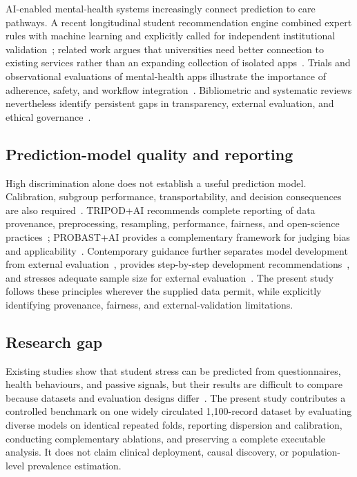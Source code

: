 \documentclass[review]{elsarticle}
\begin{document}
AI-enabled mental-health systems increasingly connect prediction to care pathways. A recent longitudinal student recommendation engine combined expert rules with machine learning and explicitly called for independent institutional validation~\cite{velmovitsky2025}; related work argues that universities need better connection to existing services rather than an expanding collection of isolated apps~\cite{pryss2025}. Trials and observational evaluations of mental-health apps illustrate the importance of adherence, safety, and workflow integration~\cite{chen2023app,carreiro2024}. Bibliometric and systematic reviews nevertheless identify persistent gaps in transparency, external evaluation, and ethical governance~\cite{chen2024bibliometric,alhuwaydi2024,cruz2025}.

\subsection{Prediction-model quality and reporting}
High discrimination alone does not establish a useful prediction model. Calibration, subgroup performance, transportability, and decision consequences are also required~\cite{steyerberg2010,niculescu2005}. TRIPOD+AI recommends complete reporting of data provenance, preprocessing, resampling, performance, fairness, and open-science practices~\cite{collins2024}; PROBAST+AI provides a complementary framework for judging bias and applicability~\cite{moons2025}. Contemporary guidance further separates model development from external evaluation~\cite{van2024evaluation}, provides step-by-step development recommendations~\cite{riley2024guide}, and stresses adequate sample size for external evaluation~\cite{riley2024samplesize}. The present study follows these principles wherever the supplied data permit, while explicitly identifying provenance, fairness, and external-validation limitations.

\subsection{Research gap}
Existing studies show that student stress can be predicted from questionnaires, health behaviours, and passive signals, but their results are difficult to compare because datasets and evaluation designs differ~\cite{daza2023,defilippis2024,shvetcov2024}. The present study contributes a controlled benchmark on one widely circulated 1,100-record dataset by evaluating diverse models on identical repeated folds, reporting dispersion and calibration, conducting complementary ablations, and preserving a complete executable analysis. It does not claim clinical deployment, causal discovery, or population-level prevalence estimation.
\end{document}
